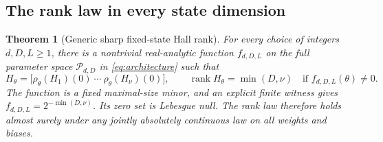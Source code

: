 \documentclass[11pt,a4paper]{article}
\numberwithin{equation}{section}
\newtheorem{theorem}{Theorem}[section]
\theoremstyle{definition}
\theoremstyle{remark}
\DeclareMathOperator{\rank}{rank}
\begin{document}
\subsection{The rank law in every state dimension}
\begin{theorem}[Generic sharp fixed-state Hall rank]\label{thm:hallrank}
For every choice of integers $d,D,L\geq1$, there is a nontrivial real-analytic function
$f_{d,D,L}$ on the full parameter space $\mathcal P_{d,D}$ in
\eqref{eq:architecture} such that
\begin{equation}\label{eq:hallrank}
 H_\theta=\bigl[\rho_\theta(H_1)(0)\ \cdots\
                    \rho_\theta(H_\nu)(0)\bigr],\qquad
 \rank H_\theta=\min(D,\nu)
 \quad\text{if }f_{d,D,L}(\theta)\ne0.
\end{equation}
The function is a fixed maximal-size minor, and an explicit finite
witness gives $f_{d,D,L}=2^{-\min(D,\nu)}$. Its zero set is Lebesgue
null. The rank law therefore holds almost surely under any jointly
absolutely continuous law on all weights and biases.
\end{theorem}
\end{document}
